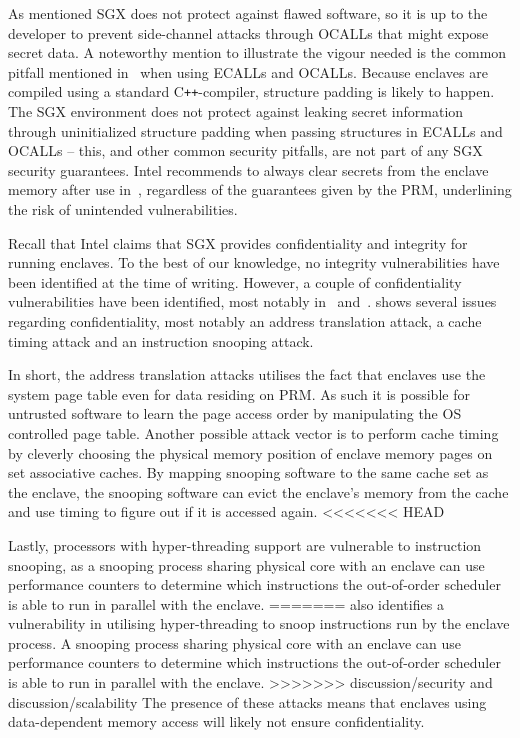 \documentclass{article}
\newcommand\cpp{C\texttt{++}\xspace}
\begin{document}
    As mentioned SGX does not protect against flawed software, so it is up to the developer to prevent side-channel attacks through OCALLs that might expose secret data.
	A noteworthy mention to illustrate the vigour needed is the common pitfall mentioned in~\cite{intel_sgx_guide} when using ECALLs and OCALLs.
	Because enclaves are compiled using a standard \cpp-compiler, structure padding is likely to happen.
	The SGX environment does not protect against leaking secret information through uninitialized structure padding when passing structures in ECALLs and OCALLs -- this, and other common security pitfalls, are not part of any SGX security guarantees.
	Intel recommends to always clear secrets from the enclave memory after use in~\cite{intel_sgx_guide}, regardless of the guarantees given by the PRM, underlining the risk of unintended vulnerabilities.

    Recall that Intel claims that SGX provides confidentiality and integrity for running enclaves.
    To the best of our knowledge, no integrity vulnerabilities have been identified at the time of writing.
    However, a couple of confidentiality vulnerabilities have been identified, most notably in~\cite{costan_intel_2016} and~\cite{chen_sgxpectre_2018}.
	\cite{costan_intel_2016} shows several issues regarding confidentiality, most notably an address translation attack, a cache timing attack and an instruction snooping attack.

    In short, the address translation attacks utilises the fact that enclaves use the system page table even for data residing on PRM.
    As such it is possible for untrusted software to learn the page access order by manipulating the OS controlled page table.
	Another possible attack vector is to perform cache timing by cleverly choosing the physical memory position of enclave memory pages on set associative caches.
	By mapping snooping software to the same cache set as the enclave, the snooping software can evict the enclave's memory from the cache and use timing to figure out if it is accessed again.
<<<<<<< HEAD

    Lastly, processors with hyper-threading support are vulnerable to instruction snooping, as a snooping process sharing physical core with an enclave can use performance counters to determine which instructions the out-of-order scheduler is able to run in parallel with the enclave.
=======
    \cite{costan_intel_2016} also identifies a vulnerability in utilising hyper-threading to snoop instructions run by the enclave process. A snooping process sharing physical core with an enclave can use performance counters to determine which instructions the out-of-order scheduler is able to run in parallel with the enclave.
>>>>>>> discussion/security and discussion/scalability
	The presence of these attacks means that enclaves using data-dependent memory access will likely not ensure confidentiality.
\end{document}
